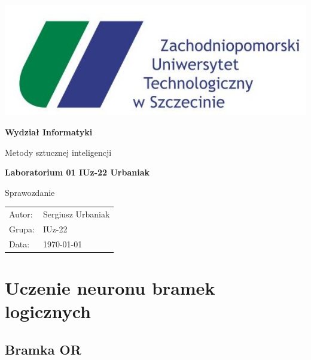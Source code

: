 \documentclass[pointlessnumbers, abstracton, headsepline, a4paper]{scrartcl}
\begin{document}
\begin{titlepage}

\begin{center}
\includegraphics[scale=0.5]{logos/zut.jpg}
\par
\end{center}

\begin{center}
\textsf{\textbf{\LARGE Wydział Informatyki}}
\end{center}{\LARGE}

\vspace{1.5cm}

\begin{center}
\textsf{\Large Metody sztucznej inteligencji}
\end{center}

\begin{center}
\textsf{\textbf{\Large Laboratorium 01 IUz-22 Urbaniak}}
\end{center}

\begin{center}
\textsf{\large Sprawozdanie}
\end{center}

\vspace{3.5cm}

\begin{center}
\begin{tabular}{ll}
Autor: & Sergiusz Urbaniak\tabularnewline
Grupa: & IUz-22\tabularnewline
Data: & \today\tabularnewline
\end{tabular}
\end{center}

\end{titlepage}

\section{Uczenie neuronu bramek logicznych}

\subsection{Bramka OR}
\end{document}
